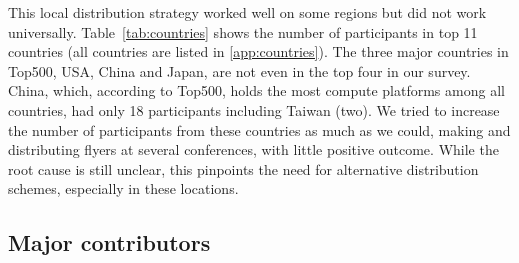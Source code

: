 \documentclass[preprint,5p,times]{elsarticle}
\def\Mcountries{Major contributors\xspace{}}%
\begin{document}
This local distribution strategy worked well on some regions but
did not work universally. Table~\ref{tab:countries} shows the number
of participants in top 11 countries (all countries are listed in
\ref{app:countries}).
The three major countries in Top500, USA, China and Japan, are not even in
the top four in our survey. China, which, according to Top500, holds the most
compute platforms among all countries, had only 18 participants including
Taiwan (two). We tried to increase the number of participants from these
countries as much as we could, making and distributing flyers at
several conferences, with little positive outcome. While the root cause is still unclear, this pinpoints the need for alternative distribution schemes, especially in these locations.

\subsection*{\Mcountries}
\end{document}
